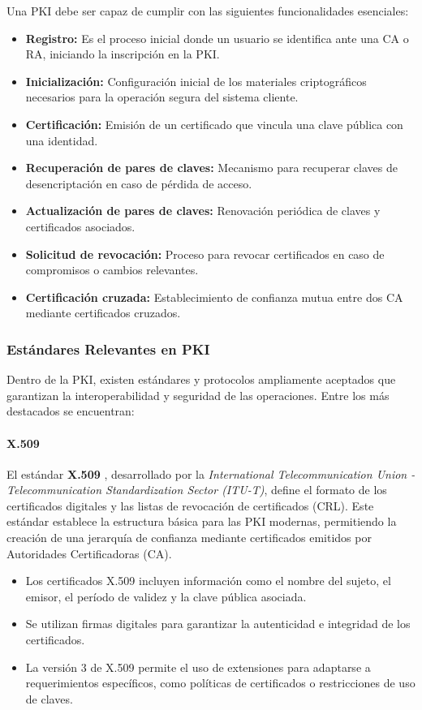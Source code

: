 Una PKI debe ser capaz de cumplir con las siguientes funcionalidades esenciales:
\begin{itemize}
    \item \textbf{Registro:} Es el proceso inicial donde un usuario se identifica ante una CA o RA, iniciando la inscripción en la PKI.
    \item \textbf{Inicialización:} Configuración inicial de los materiales criptográficos necesarios para la operación segura del sistema cliente.
    \item \textbf{Certificación:} Emisión de un certificado que vincula una clave pública con una identidad.
    \item \textbf{Recuperación de pares de claves:} Mecanismo para recuperar claves de desencriptación en caso de pérdida de acceso.
    \item \textbf{Actualización de pares de claves:} Renovación periódica de claves y certificados asociados.
    \item \textbf{Solicitud de revocación:} Proceso para revocar certificados en caso de compromisos o cambios relevantes.
    \item \textbf{Certificación cruzada:} Establecimiento de confianza mutua entre dos CA mediante certificados cruzados.
\end{itemize}

\subsubsection{Estándares Relevantes en PKI}

Dentro de la PKI, existen estándares y protocolos ampliamente aceptados que garantizan la interoperabilidad y seguridad de las operaciones. Entre los más destacados se encuentran:

\paragraph{X.509}  
El estándar \textbf{X.509} \cite{rfc5280}, desarrollado por la \textit{International Telecommunication Union - Telecommunication Standardization Sector (ITU-T)}, define el formato de los certificados digitales y las listas de revocación de certificados (CRL). Este estándar establece la estructura básica para las PKI modernas, permitiendo la creación de una jerarquía de confianza mediante certificados emitidos por Autoridades Certificadoras (CA).

\begin{itemize}
    \item Los certificados X.509 incluyen información como el nombre del sujeto, el emisor, el período de validez y la clave pública asociada.
    \item Se utilizan firmas digitales para garantizar la autenticidad e integridad de los certificados.
    \item La versión 3 de X.509 permite el uso de extensiones para adaptarse a requerimientos específicos, como políticas de certificados o restricciones de uso de claves.
\end{itemize}

